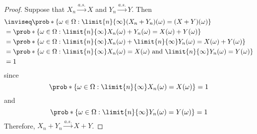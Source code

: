 \documentclass[%
  hwnumber=8,%
  studentnumber=20053722,%
  {name=Bryan Hoang}%
]{%
  mthe353answer%
}
\begin{document}
  \begin{questions}
    \setcounter{question}{2}
    \question{}\
      \begin{parts}
      \part{}\label{part:a}
      \begin{solution}
        \begin{proof}
          Suppose that \(X_n \xrightarrow{a.s.} X\) and \(Y_n \xrightarrow{a.s.} Y\).
          Then
          \begin{align*}
            &\inviseq \prob*{\left\{\omega \in \Omega : \limit{n}{\infty} (X_n+Y_n)(\omega) = (X+Y)(\omega)\right\}}\\
            &= \prob*{\left\{\omega \in \Omega : \limit{n}{\infty} X_n(\omega) + Y_n(\omega) = X(\omega) + Y(\omega)\right\}}\\
            &= \prob*{\left\{\omega \in \Omega : \limit{n}{\infty} X_n(\omega) + \limit{n}{\infty} Y_n(\omega) = X(\omega) + Y(\omega)\right\}}\\
            &= \prob*{\left\{\omega \in \Omega : \limit{n}{\infty} X_n(\omega) = X(\omega)\ \text{and}\ \limit{n}{\infty} Y_n(\omega) = Y(\omega) \right\}}\\
            &= 1
          \end{align*}
          since
          \begin{equation*}
            \prob*{\left\{\omega \in \Omega : \limit{n}{\infty} X_n(\omega) = X(\omega)\right\}} = 1
          \end{equation*}
          and
          \begin{equation*}
            \prob*{\left\{\omega \in \Omega : \limit{n}{\infty} Y_n(\omega) = Y(\omega)\right\}} = 1
          \end{equation*}
          Therefore, \(X_n+Y_n \xrightarrow{a.s.} X+Y\).
        \end{proof}
      \end{solution}

\end{parts}
\end{questions}
\end{document}
